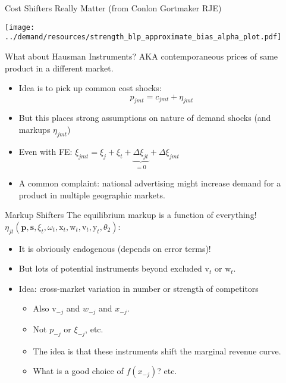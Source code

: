 \begin{frame}{Cost Shifters Really Matter (from Conlon Gortmaker RJE)}
\begin{center}
    \texttt{[image: ../demand/resources/strength\_blp\_approximate\_bias\_alpha\_plot.pdf]}
\end{center}
\end{frame}


\begin{frame}{What about Hausman Instruments?}
AKA contemporaneous prices of same product in a different market.
\begin{itemize}
    \item Idea is to pick up common cost shocks:
     $$p_{jmt} = c_{jmt} + \eta_{jmt}$$
     \item But this places strong assumptions on nature of demand shocks (and markups $ \eta_{jmt}$)
     \item Even with FE: $\xi_{jmt} = \xi_j + \xi_t + \underbrace{\Delta \xi_{jt}}_{=0} + \Delta \xi_{jmt}$
     \item A common complaint: national advertising might increase demand for a product in multiple geographic markets.
\end{itemize}
\end{frame}



\begin{frame}{Markup Shifters}
The equilibrium markup is a function of \alert{everything!} $\eta_{jt}(\symbf{p},\symbf{s},\xi_t,\omega_t,\textrm{x}_{t},\textrm{w}_{t},\textrm{v}_t,\textrm{y}_t,\theta_2)$:
\begin{itemize}
\item It is obviously \alert{endogenous} (depends on error terms)!
\item But lots of potential instruments beyond \alert{excluded} $\textrm{v}_t$ or $\textrm{w}_t$.
\item Idea: cross-market variation in number or strength of competitors
\begin{itemize}
\item Also $\textrm{v}_{-j}$ and $w_{-j}$ and $x_{-j}$.
\item Not $p_{-j}$ or $\xi_{-j}$, etc.
\item The idea is that these instruments shift the \alert{marginal revenue curve}.
\item What is a good choice of $f(x_{-j})$? etc.
\end{itemize}
\end{itemize}
\end{frame}




